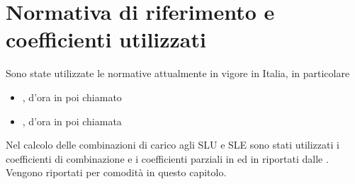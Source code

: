 \section{Normativa di riferimento e coefficienti utilizzati}
Sono state utilizzate le normative attualmente in vigore in Italia, in particolare 
\begin{itemize}
\item {}, d'ora in poi chiamato 
\item {}, d'ora in poi chiamata 
\end{itemize}
Nel calcolo delle combinazioni di carico agli SLU e SLE sono stati utilizzati i coefficienti di combinazione e i coefficienti parziali in  ed in  riportati dalle .
Vengono riportati per comodità in questo capitolo.
\clearpage
